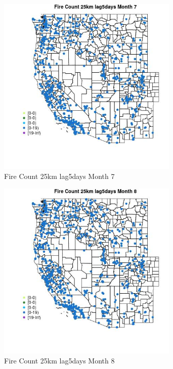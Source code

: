 \begin{figure} 
\centering  
\includegraphics[width=0.77\textwidth]{Code_Outputs/Report_ML_input_PM25_Step4_part_e_de_duplicated_aves_compiled_2019-05-21wNAs_MapObsMo7Fire_Count_25km_lag5days.jpg} 
\caption{\label{fig:Report_ML_input_PM25_Step4_part_e_de_duplicated_aves_compiled_2019-05-21wNAsMapObsMo7Fire_Count_25km_lag5days}Fire Count 25km lag5days Month 7} 
\end{figure} 
 

\clearpage 

\begin{figure} 
\centering  
\includegraphics[width=0.77\textwidth]{Code_Outputs/Report_ML_input_PM25_Step4_part_e_de_duplicated_aves_compiled_2019-05-21wNAs_MapObsMo8Fire_Count_25km_lag5days.jpg} 
\caption{\label{fig:Report_ML_input_PM25_Step4_part_e_de_duplicated_aves_compiled_2019-05-21wNAsMapObsMo8Fire_Count_25km_lag5days}Fire Count 25km lag5days Month 8} 
\end{figure} 
 

